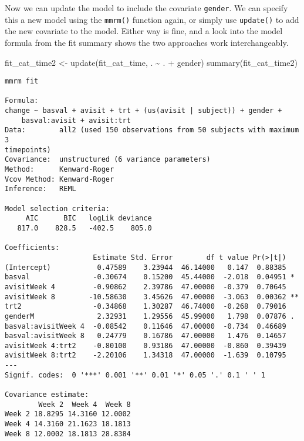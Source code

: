 \documentclass[
  letterpaper,
  DIV=11,
  numbers=noendperiod]{scrreprt}
\newenvironment{Shaded}{\begin{snugshade}}{\end{snugshade}}
\newcommand{\FunctionTok}[1]{\textcolor[rgb]{0.28,0.35,0.67}{#1}}
\newcommand{\NormalTok}[1]{\textcolor[rgb]{0.00,0.23,0.31}{#1}}
\newcommand{\OtherTok}[1]{\textcolor[rgb]{0.00,0.23,0.31}{#1}}
\newcommand{\SpecialCharTok}[1]{\textcolor[rgb]{0.37,0.37,0.37}{#1}}
\begin{document}
Now we can update the model to include the covariate \texttt{gender}. We
can specify this a new model using the \texttt{mmrm()} function again,
or simply use \texttt{update()} to add the new covariate to the model.
Either way is fine, and a look into the model formula from the fit
summary shows the two approaches work interchangeably.

\begin{Shaded}
\begin{Highlighting}[]
\NormalTok{fit\_cat\_time2 }\OtherTok{\textless{}{-}} \FunctionTok{update}\NormalTok{(fit\_cat\_time, . }\SpecialCharTok{\textasciitilde{}}\NormalTok{ . }\SpecialCharTok{+}\NormalTok{ gender)}
\FunctionTok{summary}\NormalTok{(fit\_cat\_time2)}
\end{Highlighting}
\end{Shaded}

\begin{verbatim}
mmrm fit

Formula:     
change ~ basval + avisit + trt + (us(avisit | subject)) + gender +  
    basval:avisit + avisit:trt
Data:        all2 (used 150 observations from 50 subjects with maximum 3 
timepoints)
Covariance:  unstructured (6 variance parameters)
Method:      Kenward-Roger
Vcov Method: Kenward-Roger
Inference:   REML

Model selection criteria:
     AIC      BIC   logLik deviance 
   817.0    828.5   -402.5    805.0 

Coefficients: 
                     Estimate Std. Error        df t value Pr(>|t|)   
(Intercept)           0.47589    3.23944  46.14000   0.147  0.88385   
basval               -0.30674    0.15200  45.44000  -2.018  0.04951 * 
avisitWeek 4         -0.90862    2.39786  47.00000  -0.379  0.70645   
avisitWeek 8        -10.58630    3.45626  47.00000  -3.063  0.00362 **
trt2                 -0.34868    1.30287  46.74000  -0.268  0.79016   
genderM               2.32931    1.29556  45.99000   1.798  0.07876 . 
basval:avisitWeek 4  -0.08542    0.11646  47.00000  -0.734  0.46689   
basval:avisitWeek 8   0.24779    0.16786  47.00000   1.476  0.14657   
avisitWeek 4:trt2    -0.80100    0.93186  47.00000  -0.860  0.39439   
avisitWeek 8:trt2    -2.20106    1.34318  47.00000  -1.639  0.10795   
---
Signif. codes:  0 '***' 0.001 '**' 0.01 '*' 0.05 '.' 0.1 ' ' 1

Covariance estimate:
        Week 2  Week 4  Week 8
Week 2 18.8295 14.3160 12.0002
Week 4 14.3160 21.1623 18.1813
Week 8 12.0002 18.1813 28.8384
\end{verbatim}
\end{document}
